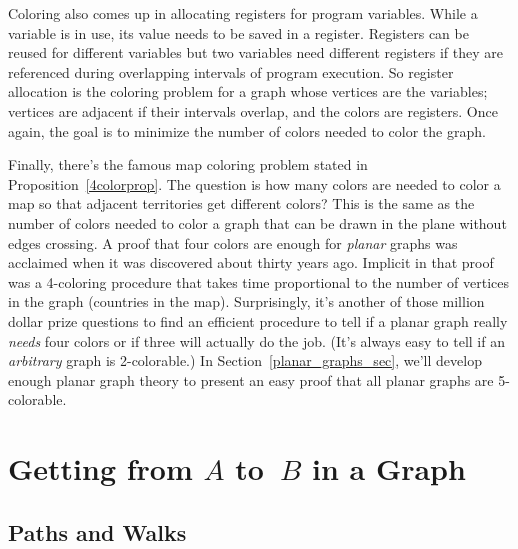 Coloring also comes up in allocating registers for program variables.
While a variable is in use, its value needs to be saved in a register.
Registers can be reused for different variables but two variables need
different registers if they are referenced during overlapping
intervals of program execution.  So register allocation is the
coloring problem for a graph whose vertices are the variables;
vertices are adjacent if their intervals overlap, and the colors are
registers.  Once again, the goal is to minimize the number of colors
needed to color the graph.

Finally, there's the famous map coloring problem stated in
Proposition~\ref{4colorprop}.  The question is how many colors are needed
to color a map so that adjacent territories get different colors?  This is
the same as the number of colors needed to color a graph that can be drawn
in the plane without edges crossing.  A proof that four colors are enough
for  \emph{planar} graphs was acclaimed when it was
discovered about thirty years ago.  Implicit in that proof was a
4-coloring procedure that takes time proportional to the number of
vertices in the graph (countries in the map).  Surprisingly, it's another
of those million dollar prize questions to find an efficient procedure to
tell if a planar graph really \emph{needs} four colors or if three will
actually do the job.  (It's always easy to tell if an \emph{arbitrary}
graph is 2-colorable.)  In Section~\ref{planar_graphs_sec}, we'll develop
enough planar graph theory to present an easy proof that all planar graphs
are 5-colorable.


\section{Getting from $A$ to~$B$ in a Graph}\label{sec:connectedness}

\subsection{Paths and Walks}

